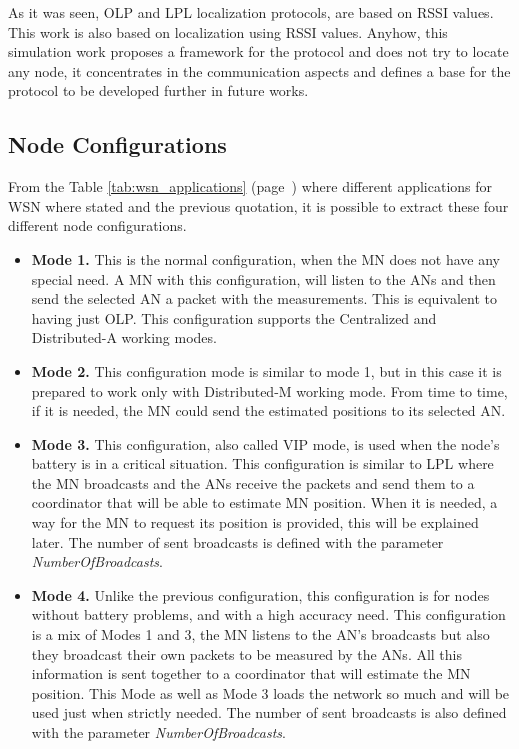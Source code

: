 As it was seen, \ac{OLP} and \ac{LPL} localization protocols, are based on \ac{RSSI} values. This work is also based on localization using 
\ac{RSSI} values. Anyhow, this simulation work proposes a framework for the protocol and does not try to locate any node, it concentrates
in the communication aspects and defines a base for the protocol to be developed further in future works.


\subsection{Node Configurations}

From the Table \ref{tab:wsn_applications} (page~\pageref{tab:wsn_applications}) where different applications for \ac{WSN} where stated and the
previous quotation, it is possible to extract these four different node configurations.

\begin{itemize}
 \item \textbf{Mode 1.} This is the normal configuration, when the \ac{MN} does not have any special need. A \ac{MN} with this configuration,
will listen to the \acp{AN} and then send the selected \ac{AN} a packet with the measurements. This is equivalent to having just \ac{OLP}. This
configuration supports the Centralized and Distributed-A working modes.

 \item \textbf{Mode 2.} This configuration mode is similar to mode 1, but in this case it is prepared to work only with Distributed-M working mode.
From time to time, if it is needed, the \ac{MN} could send the estimated positions to its selected \ac{AN}.

 \item \textbf{Mode 3.} This configuration, also called \ac{VIP} mode, is used when the node's battery is in a critical situation.
This configuration is similar to \ac{LPL} where the \ac{MN} broadcasts and the \acp{AN} receive the packets and send them to a coordinator that
will be able to estimate \ac{MN} position. When it is needed, a way for the \ac{MN} to request its position is provided, this will be explained 
later. The number of sent broadcasts is defined with the parameter \textit{NumberOfBroadcasts}.

 \item \textbf{Mode 4.} Unlike the previous configuration, this configuration is for nodes without battery problems, and with a high accuracy
need. This configuration is a mix of Modes 1 and 3, the \ac{MN} listens to the \ac{AN}'s broadcasts but also they broadcast their
own packets to be measured by the \acp{AN}. All this information is sent together to a coordinator that will estimate the \ac{MN} position.
This Mode as well as Mode 3 loads the network so much and will be used just when strictly needed. The number of sent broadcasts is also defined with 
the parameter \textit{NumberOfBroadcasts}.
\end{itemize}

